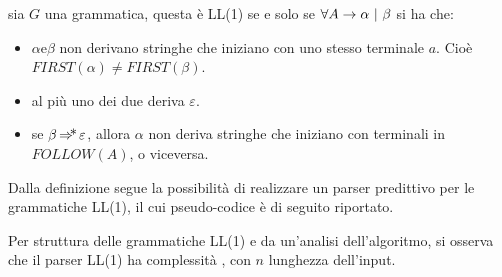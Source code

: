 \documentclass{subfiles}
\begin{document}
\begin{Definition*}
    sia $G$ una grammatica, questa è LL(1) se e solo se $\forall \Grammar{A}{\alpha}[\beta]$ si ha che:
    \begin{itemize}
        \item $\alpha \text{e} \beta$ non derivano stringhe che iniziano con uno stesso terminale $a$.
              Cioè $FIRST(\alpha) \neq FIRST(\beta)$.
        \item al più uno dei due deriva $\varepsilon$.
        \item se $\beta \operatorname{\Rightarrow\hspace{-5pt}*} \varepsilon$, allora $\alpha$ non deriva stringhe che iniziano con terminali in $FOLLOW(A)$, o viceversa.
    \end{itemize}
\end{Definition*}

Dalla definizione segue la possibilità di realizzare un parser predittivo per le grammatiche LL(1), il cui pseudo-codice è di seguito riportato.


\noindent Per struttura delle grammatiche LL(1) e da un'analisi dell'algoritmo, si osserva che il parser LL(1) ha complessità ,
con $n$ lunghezza dell'input.
\end{document}
